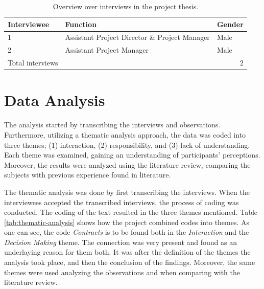 \begin{table}
    \begin{center}
        \begin{tabular}{p{}p{}p{}}
        \toprule
        \textbf{Interviewee} & \textbf{Function}          & \textbf{Gender} \\ \midrule
        1                    & Assistant Project Director \& Project Manager & Male            \\
        2                    & Assistant Project Manager  & Male            \\
        Total interviews     & \multicolumn{2}{r}{2}                        \\ \bottomrule
        \end{tabular}
        \caption{Overview over interviews in the project thesis.}
        \label{tab:paticipants}
    \end{center}
\end{table}

\section{Data Analysis}
The analysis started by transcribing the interviews and observations. Furthermore, utilizing a thematic analysis approach, the data was coded into three themes; (1) interaction, (2) responsibility, and (3) lack of understanding. Each theme was examined, gaining an understanding of participants' perceptions. Moreover, the results were analyzed using the literature review, comparing the subjects with previous experience found in literature. 

The thematic analysis was done by first transcribing the interviews. When the interviewees accepted the transcribed interviews, the process of coding was conducted. The coding of the text resulted in the three themes mentioned. Table \ref{tab:thematic-analysis} shows how the project combined codes into themes. As one can see, the code \textit{Contracts} is to be found both in the \textit{Interaction} and the \textit{Decision Making} theme. The connection was very present and found as an underlaying reason for them both. It was after the definition of the themes the analysis took place, and then the conclusion of the findings. Moreover, the same themes were used analyzing the observations and when comparing with the literature review.

